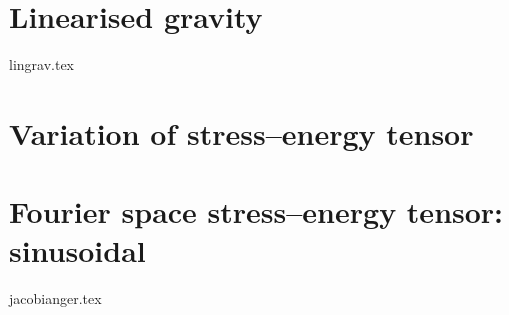 




\section{Linearised gravity}\label{app:derivations:lingrav}
    {{lingrav.tex}}

\section{Variation of stress--energy tensor}\label{app:derivations:SE_NG}


\section{Fourier space stress--energy tensor: sinusoidal}\label{app:derivations:jacobianger}
    {{jacobianger.tex}}


